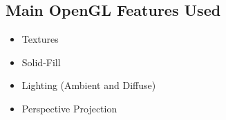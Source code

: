 \documentclass{article}
\begin{document}
	
	\subsection{Main OpenGL Features Used}
    \begin{itemize}
    	\item
    	Textures    	
    	\item
    	Solid-Fill
    	\item
    	Lighting (Ambient and Diffuse)
    	\item
    	Perspective Projection
    \end{itemize}
	
\end{document}
